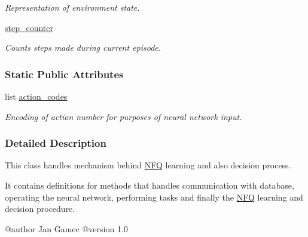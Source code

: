 \begin{DoxyCompactItemize}
\begin{DoxyCompactList}\small\item\em Representation of environment state. \end{DoxyCompactList}\item 
\hypertarget{class_n_f_q_1_1_n_f_q_aaa8f1acc9fab510954fe555060a241b2}{\hyperlink{class_n_f_q_1_1_n_f_q_aaa8f1acc9fab510954fe555060a241b2}{step\+\_\+counter}}\label{class_n_f_q_1_1_n_f_q_aaa8f1acc9fab510954fe555060a241b2}

\begin{DoxyCompactList}\small\item\em Counts steps made during current episode. \end{DoxyCompactList}\end{DoxyCompactItemize}
\subsubsection*{Static Public Attributes}
\begin{DoxyCompactItemize}
\item 
\hypertarget{class_n_f_q_1_1_n_f_q_a9cec28f2b80d53fea0778e72264a1b2a}{list \hyperlink{class_n_f_q_1_1_n_f_q_a9cec28f2b80d53fea0778e72264a1b2a}{action\+\_\+codes}}\label{class_n_f_q_1_1_n_f_q_a9cec28f2b80d53fea0778e72264a1b2a}

\begin{DoxyCompactList}\small\item\em Encoding of action number for purposes of neural network input. \end{DoxyCompactList}\end{DoxyCompactItemize}


\subsubsection{Detailed Description}
This class handles mechanism behind \hyperlink{class_n_f_q_1_1_n_f_q}{N\+F\+Q} learning and also decision process. 

It contains definitions for methods that handles communication with database, operating the neural network, performing tasks and finally the \hyperlink{class_n_f_q_1_1_n_f_q}{N\+F\+Q} learning and decision procedure. \begin{DoxyVerb}@author Jan Gamec
@version 1.0
\end{DoxyVerb}
 

